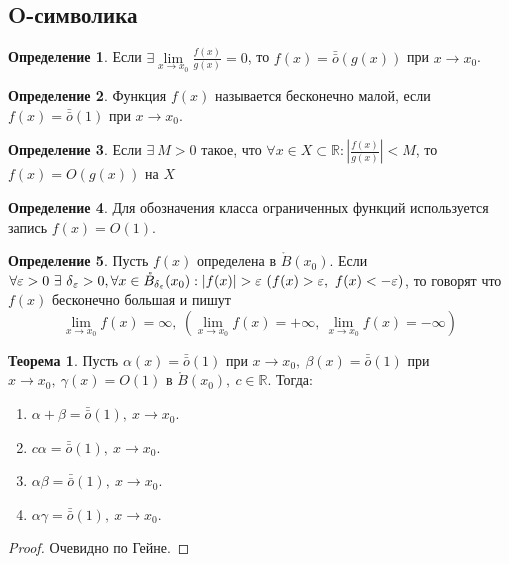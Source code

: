 \documentclass[a4paper, 12pt]{article}
\newcommand{\R}{\mathbb{R}}
\newcommand{\Bo}{\mathring{B}}
\renewcommand{\epsilon}{\varepsilon}
\newcommand{\om}{\bar{\bar{o}}}
\theoremstyle{definition}
\newtheorem*{definition}{Определение}
\newtheorem*{theorem}{Теорема}
\begin{document}
    \subsection{O-символика}
        \begin{definition}
            Если $\exists \lim\limits_{x\to x_0}\frac{f(x)}{g(x)}=0$, то $f(x)=\om(g(x))$ при $x\to x_0$.
        \end{definition} 
        \begin{definition}
            Функция $f(x)$ называется бесконечно малой, если $f(x)=\om(1)$ при $x\to x_0$.
        \end{definition}
        \begin{definition}
            Если $\exists\ M>0$ такое, что $\forall x\in X\subset \R: |\frac{f(x)}{g(x)}|<M$, то\\
            $f(x)=O(g(x))$ на $X$
        \end{definition} 
        \begin{definition}
            Для обозначения класса ограниченных функций используется запись $f(x)=O(1)$.
        \end{definition}
        \begin{definition}
            Пусть $f(x)$ определена в $\Bo(x_0)$. Если $\forall \epsilon>0\ \exists\ \delta{_\epsilon}>0,\\
            \forall x\in \Bo_{\delta_{\epsilon}}(x_0): |f(x)|>\epsilon\ (f(x)>\epsilon,\ f(x)<-\epsilon)$, то говорят что $f(x)$ бесконечно большая и пишут
            \[\lim\limits_{x\to x_0}f(x)=\infty,\ (\lim\limits_{x\to x_0}f(x)=+\infty,\ \lim\limits_{x\to x_0}f(x)=-\infty)\]
        \end{definition}
        \begin{theorem}
            Пусть $\alpha(x)=\om(1)$ при $x\to x_0,\ \beta(x)=\om(1)$ при $x\to x_0,\ \gamma(x)=O(1)$ в $\Bo(x_0),\ c\in \R$. Тогда:
            \begin{enumerate}
                \item $\alpha+\beta=\om(1),\ x\to x_0$.
                \item $c \alpha=\om(1),\ x\to x_0$.
                \item $\alpha\beta=\om(1),\ x\to x_0$.
                \item $\alpha\gamma=\om(1),\ x\to x_0$.
            \end{enumerate}
        \end{theorem} 
        \begin{proof}
            Очевидно по Гейне.
        \end{proof} 
\end{document}

